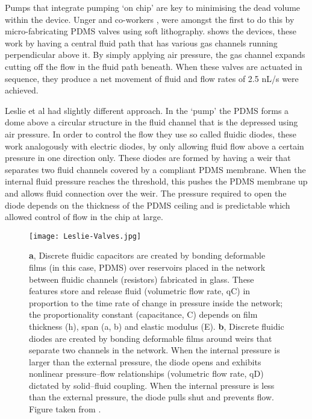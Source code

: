 Pumps that integrate pumping ‘on chip’ are key to minimising the dead volume within the device.
Unger and co-workers \citep{RN59}, were amongst the first to do this by micro-fabricating PDMS valves
using soft lithography.  shows the devices, these work by having a central fluid path that has various gas
channels running perpendicular above it. By simply applying air pressure, the gas channel expands cutting off
the flow in the fluid path beneath. When these valves are actuated in sequence, they produce a
net movement of fluid and flow rates of 2.5 nL/s were achieved.

Leslie et al \citep{RN100} had slightly different
approach. In the ‘pump’ the PDMS forms
a dome above a circular structure in the fluid channel that is the depressed using air
pressure. In order to control the flow they use so called fluidic diodes, these work
analogously with electric diodes, by only allowing fluid flow above a certain pressure in
one direction only. These diodes are formed by having a weir that separates two fluid
channels covered by a compliant PDMS membrane. When the internal fluid pressure reaches the
threshold, this pushes the PDMS membrane up and allows fluid connection over the weir. The
pressure required to open the diode depends on the thickness of the PDMS ceiling and is
predictable which allowed control of flow in the chip at large.

\begin{figure}
\begin{center}
  \texttt{[image: Leslie-Valves.jpg]}
\end{center}
  \caption{\textbf{a}, Discrete fluidic capacitors are created by bonding deformable films (in
   this case, PDMS) over reservoirs placed in the network between fluidic channels (resistors)
    fabricated in glass. These features store and release fluid (volumetric flow rate, qC) in
    proportion to the time rate of change in pressure inside the network; the proportionality
    constant (capacitance, C) depends on film thickness (h), span (a, b) and elastic modulus
    (E). \textbf{b}, Discrete fluidic diodes are created by bonding deformable films around
    weirs that separate two channels in the network. When the internal pressure is larger than
    the external pressure, the diode opens and exhibits nonlinear pressure–flow relationships
    (volumetric flow rate, qD) dictated by solid–fluid coupling. When the internal pressure is
    less than the external pressure, the diode pulls shut and prevents flow. Figure taken from
    \citep{RN100}.}
  \label{fig:Leslie-valves}
\end{figure}

